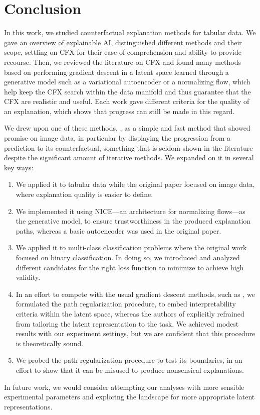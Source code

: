 \documentclass[../main.tex]{subfiles}
\begin{document}
\chapter{Conclusion}
\label{ch:conclusion}

In this work, we studied counterfactual explanation methods for tabular data.
We gave an overview of explainable AI, distinguished different methods and their scope, settling on CFX for their ease of comprehension and ability to provide recourse.
Then, we reviewed the literature on CFX and found many methods based on performing gradient descent in a latent space learned through a generative model such as a variational autoencoder or a normalizing flow, which help keep the CFX search within the data manifold and thus guarantee that the CFX are realistic and useful.
Each work gave different criteria for the quality of an explanation, which shows that progress can still be made in this regard.

We drew upon one of these methods, \ls{}, as a simple and fast method that showed promise on image data, in particular
by displaying the progression from a prediction to its counterfactual, something that is seldom shown in the literature
despite the significant amount of iterative methods.
We expanded on it in several key ways:
\begin{enumerate}
    \item We applied it to tabular data while the original \ls{} paper focused on image data, where explanation quality is easier to define.
    \item We implemented it using NICE---an architecture for normalizing flows---as the generative model, to ensure trustworthiness in the produced explanation paths, whereas a basic autoencoder was used in the original \ls{} paper.
    \item We applied it to multi-class classification problems where the original work focused on binary classification. In doing so, we introduced and analyzed different candidates for the right loss function to minimize to achieve high validity.
    \item In an effort to compete with the usual gradient descent methods, such as \revise{} \cite{joshiRealistic2019}, we formulated the path regularization procedure, to embed interpretability criteria within the latent space, whereas the authors of \cite{cohenGifsplanation2022} explicitly refrained from tailoring the latent representation to the task.
    We achieved modest results with our experiment settings, but we are confident that this procedure is theoretically sound.
    \item We probed the path regularization procedure to test its boundaries, in an effort to show that it can be misused to produce nonsensical explanations.
\end{enumerate}

In future work, we would consider attempting our analyses with more sensible experimental parameters
and exploring the landscape for more appropriate latent representations.
\end{document}

